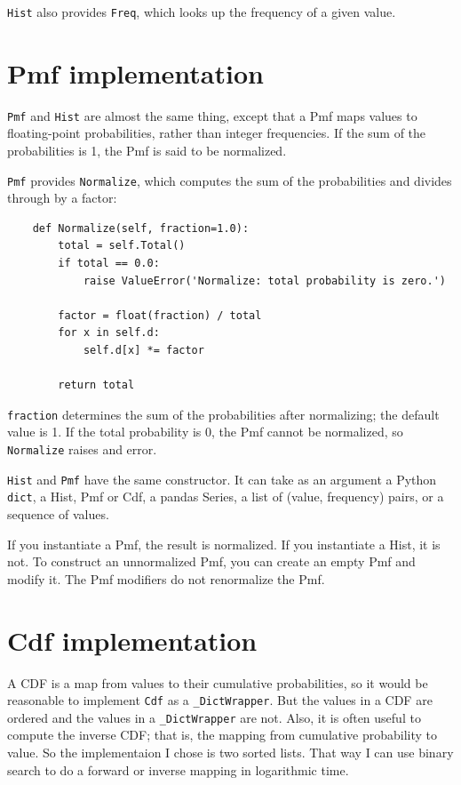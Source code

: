 \documentclass[12pt]{book}
\begin{document}
{\tt Hist} also provides {\tt Freq}, which looks up the frequency
of a given value.


\section{Pmf implementation}

{\tt Pmf} and {\tt Hist} are almost the same thing, except that a Pmf
maps values to floating-point probabilities, rather than integer
frequencies.  If the sum of the probabilities is 1, the Pmf is said to
be normalized.

{\tt Pmf} provides {\tt Normalize}, which computes the sum of the
probabilities and divides through by a factor:

\begin{verbatim}
    def Normalize(self, fraction=1.0):
        total = self.Total()
        if total == 0.0:
            raise ValueError('Normalize: total probability is zero.')

        factor = float(fraction) / total
        for x in self.d:
            self.d[x] *= factor

        return total
\end{verbatim}

{\tt fraction} determines the sum of the probabilities after normalizing;
the default value is 1.
If the total probability is 0, the Pmf cannot be normalized, so
{\tt Normalize} raises and error.

{\tt Hist} and {\tt Pmf} have the same constructor.  It can take
as an argument a Python {\tt dict}, a Hist, Pmf or Cdf, a pandas
Series, a list of (value, frequency) pairs, or a sequence of values.

If you instantiate a Pmf, the result is normalized.  If you
instantiate a Hist, it is not.  To construct an unnormalized Pmf,
you can create an empty Pmf and modify it.  The Pmf modifiers do
not renormalize the Pmf.


\section{Cdf implementation}

A CDF is a map from values to their cumulative probabilities, so
it would be reasonable to implement {\tt Cdf} as a \verb"_DictWrapper".
But the values in a CDF are ordered and the values in a \verb"_DictWrapper"
are not.  Also, it is often useful to compute the inverse CDF; that
is, the mapping from cumulative probability to value.  So the
implementaion I chose is two sorted lists.  That way I can use
binary search to do a forward or inverse mapping in logarithmic time.
\end{document}
